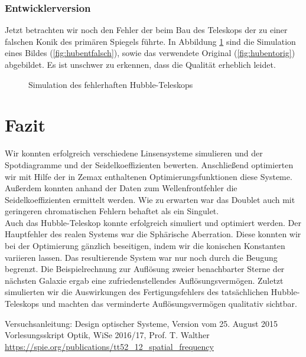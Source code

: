 \documentclass[twoside,colorback,accentcolor=tud4c,11pt]{tudreport}
\begin{document}
\subsection{Entwicklerversion}
Jetzt betrachten wir noch den Fehler der beim Bau des Teleskops der zu einer falschen Konik des primären Spiegels führte. In Abbildung \ref{fig:hubent} sind die Simulation eines Bildes (\ref{fig:hubentfalsch}), sowie das verwendete Original (\ref{fig:hubentorig}) abgebildet. Es ist unschwer zu erkennen, dass die Qualität erheblich leidet.
\begin{figure}[H]
\centering
  \quad
  \quad   
  \caption{Simulation des fehlerhaften Hubble-Teleskops}
  \label{fig:hubent}
\end{figure}
\chapter{Fazit}	
Wir konnten erfolgreich verschiedene Linsensysteme simulieren und der Spotdiagramme und der Seidelkoeffizienten bewerten. Anschließend optimierten wir mit Hilfe der in Zemax enthaltenen Optimierungsfunktionen diese Systeme. Außerdem konnten anhand der Daten zum Wellenfrontfehler die Seidelkoeffizienten ermittelt werden. Wie zu erwarten war das Doublet auch mit geringeren chromatischen Fehlern behaftet als ein Singulet.\\
Auch das Hubble-Teleskop konnte erfolgreich simuliert und optimiert werden. Der Hauptfehler des realen Systems war die Sphärische Aberration. Diese konnten wir bei der Optimierung gänzlich beseitigen, indem wir die konischen Konstanten variieren lassen. Das resultierende System war nur noch durch die Beugung begrenzt. Die Beispielrechnung zur Auflösung zweier benachbarter Sterne der nächsten Galaxie ergab eine zufriedenstellendes Auflösungsvermögen. Zuletzt simulierten wir die Auswirkungen des Fertigungsfehlers des tatsächlichen Hubble-Teleskops und machten das verminderte Auflösungsvermögen qualitativ sichtbar.
\renewcommand{\bibname}{Literatur}
\begin{thebibliography}{0}
 Versuchsanleitung: Design optischer Systeme, Version vom 25. August 2015
 Vorlesungsskript Optik, WiSe 2016/17, Prof. T. Walther
 \url{https://spie.org/publications/tt52_12_spatial_frequency}

\end{thebibliography}
\end{document}
